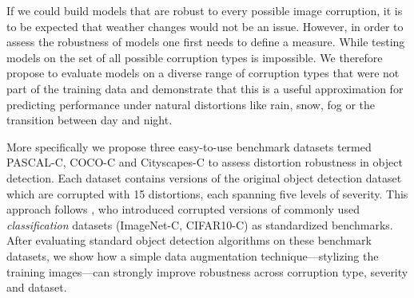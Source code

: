 \documentclass{article}
\begin{document}
If we could build models that are robust to every possible image corruption, it   is to be expected that weather changes would not be an issue. However, in order to assess the robustness of models one first needs to define a measure. While testing models on the set of all possible corruption types is impossible. We therefore propose to evaluate models on a diverse range of corruption types that were not part of the training data and demonstrate that this is a useful approximation for predicting performance under natural distortions like rain, snow, fog or the transition between day and night.

More specifically we propose three easy-to-use benchmark datasets termed PASCAL-C, COCO-C and Cityscapes-C to assess distortion robustness in object detection. Each dataset contains versions of the original object detection dataset which are corrupted with 15 distortions, each spanning five levels of severity. This approach follows \cite{hendrycks2018benchmarking}, who introduced corrupted versions of commonly used \textit{classification} datasets (ImageNet-C, CIFAR10-C) as standardized benchmarks. After evaluating standard object detection algorithms on these benchmark datasets, we show how a simple data augmentation technique---stylizing the training images---can strongly improve robustness across corruption type, severity and dataset.
\end{document}
